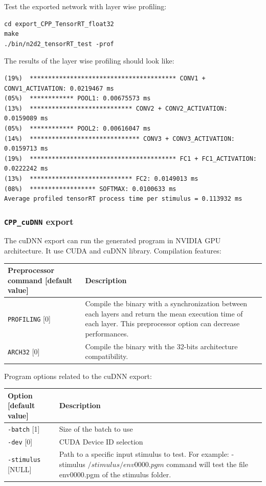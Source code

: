 \documentclass[a4paper,11pt,oneside]{article}
\begin{document}
Test the exported network with layer wise profiling:
\begin{lstlisting}
cd export_CPP_TensorRT_float32
make
./bin/n2d2_tensorRT_test -prof
\end{lstlisting}

The results of the layer wise profiling should look like:
\begin{lstlisting}[style=console]
(19%)  **************************************** CONV1 + CONV1_ACTIVATION: 0.0219467 ms
(05%)  ************ POOL1: 0.00675573 ms
(13%)  **************************** CONV2 + CONV2_ACTIVATION: 0.0159089 ms
(05%)  ************ POOL2: 0.00616047 ms
(14%)  ****************************** CONV3 + CONV3_ACTIVATION: 0.0159713 ms
(19%)  **************************************** FC1 + FC1_ACTIVATION: 0.0222242 ms
(13%)  **************************** FC2: 0.0149013 ms
(08%)  ****************** SOFTMAX: 0.0100633 ms
Average profiled tensorRT process time per stimulus = 0.113932 ms

\end{lstlisting}

\subsubsection{\texorpdfstring{%
\lstinline[basicstyle=\ttfamily\bfseries]!CPP_cuDNN! export}{CPP\_cuDNN export}}
The cuDNN export can run the generated program in NVIDIA GPU architecture.
It use CUDA and cuDNN library.
Compilation features:
\begin{center}
 \begin{tabular}{| p{7cm} | p{8cm} | }
 \hline
 Preprocessor command [default value] & Description\\
 \hline\hline
  \lstinline!PROFILING! [0] & Compile the binary with a synchronization
  between each layers and return the mean execution time of each layer.
  This preprocessor option can decrease performances.\\
  \lstinline!ARCH32! [0] & Compile the binary with the 32-bits architecture
   compatibility.\\
 \hline
\end{tabular}
\end{center}

Program options related to the cuDNN export:
\begin{center}
 \begin{tabular}{| p{5cm} | p{10cm} | }
 \hline
 Option [default value] & Description\\
 \hline\hline
  \lstinline!-batch! [1] & Size of the batch to use \\
  \lstinline!-dev! [0] & CUDA Device ID selection  \\
  \lstinline!-stimulus! [NULL] & Path to a specific input stimulus to test.
  For example: -stimulus ${/stimulus/env0000.pgm}$ command will test the file
   env0000.pgm  of the stimulus folder.\\
 \hline
\end{tabular}
\end{center}
\end{document}
